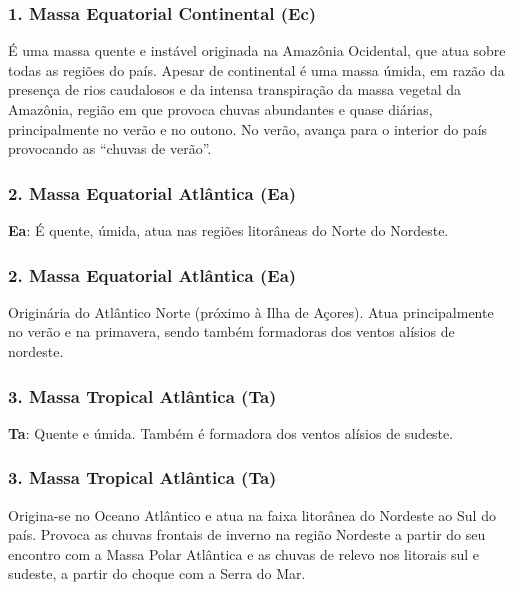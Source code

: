 \begin{frame}
  \frametitle{1. Massa Equatorial Continental (Ec)}
  \begin{block}{}
    É uma massa quente e instável originada na Amazônia Ocidental, que atua
    sobre todas as regiões do país.  Apesar de continental é uma massa úmida, em
    razão da presença de rios caudalosos e da intensa transpiração da massa
    vegetal da Amazônia, região em que provoca chuvas abundantes e quase
    diárias, principalmente no verão e no outono.  No verão, avança para o
    interior do país provocando as ``chuvas de verão''.
  \end{block}
\end{frame}


\begin{frame}
  \frametitle{2. Massa Equatorial Atlântica (Ea)}
  {\scriptsize
  \begin{block}{}
    {\bf Ea}: É quente, úmida, atua nas regiões litorâneas do Norte do Nordeste.
  \end{block}
  }
  \begin{center}
  \end{center}
\end{frame}


\begin{frame}
  \frametitle{2. Massa Equatorial Atlântica (Ea)}
  {\small
  \begin{block}{}
    Originária do Atlântico Norte (próximo à Ilha de Açores).  Atua
    principalmente no verão e na primavera, sendo também formadoras dos ventos
    alísios de nordeste.
  \end{block}
  }
\end{frame}

\begin{frame}
  \frametitle{3. Massa Tropical Atlântica (Ta)}
  {\scriptsize
  \begin{block}{}
    {\bf Ta}: Quente e úmida.  Também é formadora dos ventos alísios de sudeste.
  \end{block}
  }
  \begin{center}
  \end{center}
\end{frame}


\begin{frame}
  \frametitle{3. Massa Tropical Atlântica (Ta)}
  {\small
  \begin{block}{}
  Origina-se no Oceano Atlântico e atua na faixa litorânea do Nordeste ao Sul do
  país.  Provoca as chuvas frontais de inverno na região Nordeste a partir do
  seu encontro com a Massa Polar Atlântica e as chuvas de relevo nos litorais
  sul e sudeste, a partir do choque com a Serra do Mar.
  \end{block}
  }
\end{frame}



